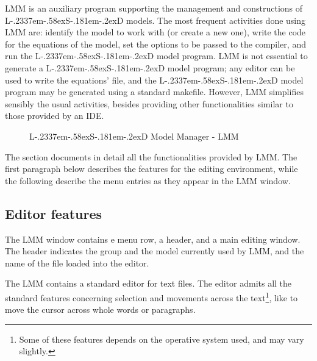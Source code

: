 \documentclass [11pt,a4paper] {book}
\def\LsD{{L\kern-.2337em\lower-.58ex\hbox{S}\kern-.181em\lower-.2ex\hbox{D}}\xspace}
\begin{document}
LMM is an auxiliary program supporting the management and constructions of \LsD models. The most frequent activities done using LMM are: identify the model to work with (or create a new one), write the code for the equations of the model, set the options to be passed to the compiler, and run the \LsD model program. LMM is not essential to generate a \LsD model program; any editor can be used to write the equations' file, and the \LsD model program may be generated using a standard makefile. However, LMM simplifies sensibly the usual activities, besides providing other functionalities similar to those provided by an IDE.

\begin{figure}[ht]
  \centering
  \caption{\LsD Model Manager - LMM}
  \label{fig:LMM2}
\end{figure}

The section documents in detail all the functionalities provided by LMM. The first paragraph below describes the features for the editing environment, while the following describe the menu entries as they appear in the LMM window.


\subsection{Editor features}

The LMM window contains e menu row, a header, and a main editing window. The header indicates the group and the model currently used by LMM, and the name of the file loaded into the editor.

The LMM contains a standard editor for text files. The editor admits all the standard features concerning selection and movements across the text\footnote{Some of these features depends on the operative system used, and may vary slightly.}, like  to move the cursor across whole words or paragraphs.
\end{document}
